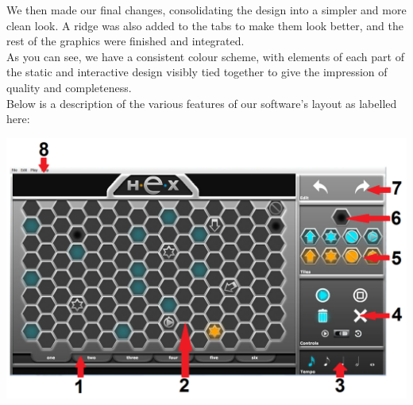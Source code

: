 \documentclass[10pt,a4paper]{article}
\begin{document}
We then made our final changes, consolidating the design into a simpler and more clean look. A ridge was also added to the tabs to make them look better, and the rest of the graphics were finished and integrated.
\\
As you can see, we have a consistent colour scheme, with elements of each part of the static and interactive design visibly tied together to give the impression of quality and completeness.
\\
Below is a description of the various features of our software's layout as labelled here:
\begin{center}
\includegraphics[scale=0.45]{numlayout.png}
\end{center}
\end{document}
